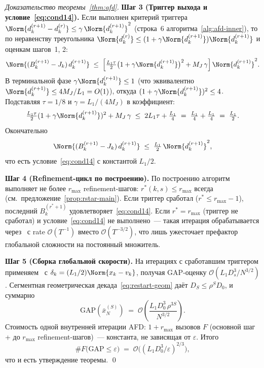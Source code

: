 \begin{proof}[Доказательство теоремы~\ref{thm:afd}]
\medskip\noindent\textbf{Шаг 3 (Триггер выхода и условие~\eqref{eq:cond14}).}
Если выполнен критерий триггера
$\Norm{d^{(r+1)}_k - d^{(r)}_k} \le \gamma\,\Norm{d^{(r+1)}_k}^{2}$
(строка~6 алгоритма~\ref{alg:afd-inner}), то по неравенству треугольника
$\Norm{d^{(r)}_k} \le (1 + \gamma\Norm{d^{(r+1)}_k})\Norm{d^{(r+1)}_k}$
и оценкам шагов~1, 2:
\[
\Norm{(B_k^{(r+1)} - J_k)\, d^{(r+1)}_k}
\;\le\;
\Bigl[\tfrac{L_1\tau}{2}\bigl(1 + \gamma\Norm{d^{(r+1)}_k}\bigr)^{2}
       + M_J\,\gamma\Bigr]\,\Norm{d^{(r+1)}_k}^{2}.
\]
В терминальной фазе $\gamma\Norm{d^{(r+1)}_k} \le 1$ (что эквивалентно
$\Norm{d^{(r+1)}_k} \le 4 M_J/L_1 = O(1)$), откуда
$(1 + \gamma\Norm{d^{(r+1)}_k})^{2} \le 4$. Подставляя $\tau = 1/8$ и
$\gamma = L_1/(4 M_J)$ в коэффициент:
\begin{equation}
\tfrac{L_1\tau}{2}(1 + \gamma\Norm{d^{(r+1)}_k})^{2}
+ M_J\,\gamma
\;\le\;
2 L_1 \tau + \tfrac{L_1}{4}
\;=\;
\tfrac{L_1}{4} + \tfrac{L_1}{4}
\;=\;
\tfrac{L_1}{2}.
\label{eq:afd-coef}
\end{equation}
Окончательно
\begin{equation}
\Norm{(B_k^{(r+1)} - J_k)\, d^{(r+1)}_k}
\;\le\; \tfrac{L_1}{2}\,\Norm{d^{(r+1)}_k}^{2},
\label{eq:afd-cond14}
\end{equation}
что есть условие~\eqref{eq:cond14} с константой $L_1/2$.

\medskip\noindent\textbf{Шаг 4 (Refinement-цикл по построению).}
По построению алгоритм выполняет не более $r_{\max}$ refinement-шагов:
$r^{*}(k, s) \le r_{\max}$ всегда (см.~предложение~\ref{prop:rstar-main}).
Если триггер сработал ($r^{*} \le r_{\max}-1$), последний $B_k^{(r^{*}+1)}$
удовлетворяет~\eqref{eq:cond14}. Если $r^{*} = r_{\max}$ (триггер не
сработал) и условие~\eqref{eq:cond14} не выполнено~--- такая итерация
обрабатывается через~\cite[Theorem~3.2]{Agafonov2024VIJI} с rate
$\mathcal O(T^{-1})$ вместо $\mathcal O(T^{-3/2})$, что лишь ужесточает
префактор глобальной сложности на постоянный множитель.

\medskip\noindent\textbf{Шаг 5 (Сборка глобальной скорости).}
На итерациях с сработавшим триггером применяем~\cite[Theorem~3.3]{Agafonov2024VIJI}
с $\delta_k = (L_1/2)\Norm{x_k - v_k}$, получая GAP-оценку
$\mathcal O(L_1 D_s^{3}/N^{3/2})$. Сегментная геометрическая
декада~\eqref{eq:restart-geom} даёт $D_S \le \rho^S D_0$, и суммарно
\[
\mathrm{GAP}(\bar x^{(S)}_N)
\;=\;
\mathcal O\!\left(\frac{L_1 D_0^{3}\,\rho^{3 S}}{N^{3/2}}\right).
\]
Стоимость одной внутренней итерации AFD: $1 + r_{\max}$ вызовов $F$
(основной шаг + до $r_{\max}$ refinement-шагов)~--- константа, не
зависящая от $\varepsilon$. Итого
\[
\#F\bigl(\mathrm{GAP} \le \varepsilon\bigr)
\;=\;
\mathcal O\!\bigl((L_1 D_0^{3}/\varepsilon)^{2/3}\bigr),
\]
что и есть утверждение теоремы. \qed
\end{proof}

